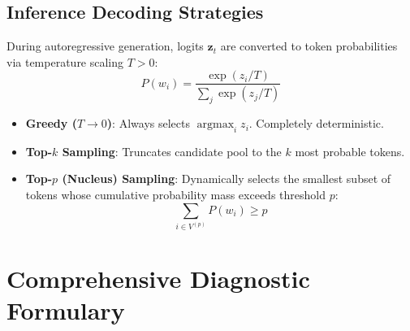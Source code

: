 \documentclass[11pt,a4paper]{article}
\begin{document}
\subsection{Inference Decoding Strategies}
During autoregressive generation, logits $\bm{z}_t$ are converted to token probabilities via temperature scaling $T > 0$:
\begin{equation}
    P(w_i) = \frac{\exp(z_i / T)}{\sum_j \exp(z_j / T)}
\end{equation}
\begin{itemize}
    \item \textbf{Greedy ($T \to 0$)}: Always selects $\operatorname{argmax}_i z_i$. Completely deterministic.
    \item \textbf{Top-$k$ Sampling}: Truncates candidate pool to the $k$ most probable tokens.
    \item \textbf{Top-$p$ (Nucleus) Sampling}: Dynamically selects the smallest subset of tokens whose cumulative probability mass exceeds threshold $p$:
    \begin{equation}
        \sum_{i \in V^{(p)}} P(w_i) \ge p
    \end{equation}
\end{itemize}

\section{Comprehensive Diagnostic Formulary}
\end{document}

